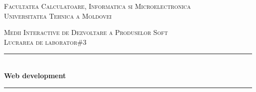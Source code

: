 \documentclass[11pt]{article}
\begin{document}
\begin{titlepage}

  \begin{center} %

  \textsc{\large Facultatea Calculatoare, Informatica si Microelectronica}\\[0.5cm]
  \textsc{\large Universitatea Tehnica a Moldovei}\\[1.2cm] %
  \vspace{25 mm}

  \textsc{\Large Medii Interactive de Dezvoltare a Produselor Soft}\\[0.5cm] %
  \textsc{\large Lucrarea de laborator\#3}\\[0.5cm] %

\newcommand{\HRule}{\rule{\linewidth}{0.5mm}} %

  \vspace{10 mm}
  \HRule \\[0.4cm]
  { \LARGE \bfseries Web development  }\\[0.4cm] %
  \HRule \\[1.5cm]

      \vspace{30mm}


\end{center}
\end{titlepage}
\end{document}

